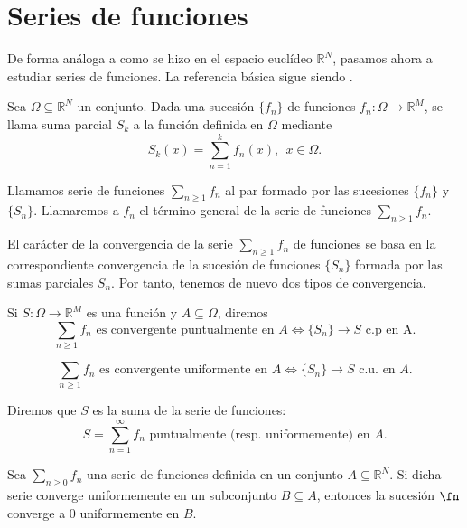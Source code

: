 \newpage



\section{Series de funciones}

De forma análoga a como se hizo en el espacio euclídeo $\mathbb{R}^N$, pasamos ahora a estudiar series de funciones. La referencia básica sigue siendo \cite[Capítulo 5]{marsden}.

\begin{ndef}
  Sea $\Omega\subseteq \mathbb R^N$ un conjunto.
  Dada una sucesi\'on $\{f_n \}$ de funciones $f_n : \Omega \longrightarrow \mathbb R^M$, se llama suma parcial $S_k$ a la funci\'on definida en $\Omega$ mediante
  \[
    S_k (x) = \sum_{n=1}^{k} f_n(x),\ \ x\in\Omega.
  \]
\end{ndef}

\begin{ndef}
  Llamamos serie  de funciones $\sum_{n\geq 1} f_n$ al par formado por las sucesiones  $\{ f_n \}$ y $\{S_n\}$. Llamaremos a $f_n$ el t\'ermino general de la serie de funciones $\displaystyle\sum_{n\geq 1} f_n$.
\end{ndef}


El car\'acter de la convergencia de la serie $\sum_{n\geq 1} f_n$ de funciones se basa en la correspondiente convergencia de la sucesi\'on de funciones $\{S_n\}$ formada por las sumas parciales $S_n$. Por tanto, tenemos de nuevo dos tipos de convergencia.
\begin{ndef}
  Si $S:\Omega\longrightarrow \mathbb R^M$ es una funci\'on y $A\subseteq \Omega$, diremos
  $$\sum_{n\geq 1} f_n  \mbox{ es convergente puntualmente en } A \Leftrightarrow \{S_n \} \longrightarrow S\text{ c.p en A.}$$

  $$\sum_{n\geq 1} f_n  \mbox{ es convergente uniformente en }A \Leftrightarrow \{S_n \} \longrightarrow S \mbox{ c.u. en }A.$$

  Diremos que $S$ es la suma de la serie de funciones:
  \[
    S=\displaystyle \sum_{n=1}^{\infty} f_n \mbox{ puntualmente (resp. uniformemente) en $A$.}
  \]
\end{ndef}

\begin{nprop}
  Sea $\sum_{n \ge 0} f_n$ una serie de funciones definida en un conjunto $A \subseteq \mathbb{R}^N$. Si dicha serie converge uniformemente en un subconjunto $B \subseteq A$, entonces la sucesión $\fn$ converge a 0 uniformemente en $B$.
\end{nprop}

